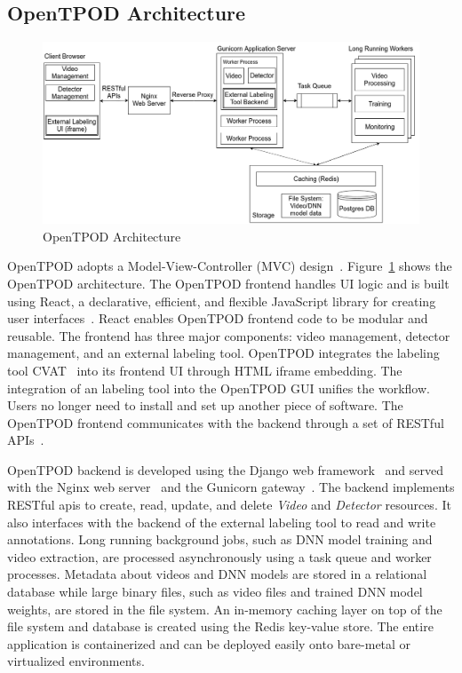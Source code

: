 \subsection{OpenTPOD Architecture}

\begin{figure}[]
  \hspace{-.1in}
    \includegraphics[width=1.1\textwidth]{FIGS/tpod-arch}
    \caption{OpenTPOD Architecture}
  \label{figs:tpod-arch}
\end{figure}

OpenTPOD adopts a Model-View-Controller (MVC) design~\cite{krasner1988description}.
Figure~\ref{figs:tpod-arch} shows the OpenTPOD architecture. The OpenTPOD frontend
handles UI logic and is built using React, a declarative, efficient, and
flexible JavaScript library for creating user interfaces~\cite{staff2016react}.
React enables OpenTPOD frontend code to be modular and reusable. The frontend has
three major components: video management, detector management, and an external
labeling tool. OpenTPOD integrates the labeling tool CVAT~\cite{cvat2019} into its
frontend UI through HTML iframe embedding. The integration of an labeling tool
into the OpenTPOD GUI unifies the workflow. Users no longer need to install and set
up another piece of software. The OpenTPOD frontend communicates with the backend
through a set of RESTful APIs~\cite{richardson2008restful}. 

OpenTPOD backend is developed using the Django web
framework~\cite{holovaty2009definitive} and served with the Nginx web
server~\cite{nedelcu2010nginx} and the Gunicorn gateway~\cite{gunicorn2017http}.
The backend implements RESTful apis to create, read, update, and delete
\textit{Video} and \textit{Detector} resources. It also interfaces with the
backend of the external labeling tool to read and write annotations. Long
running background jobs, such as DNN model training and video extraction, are
processed asynchronously using a task queue and worker processes. Metadata about
videos and DNN models are stored in a relational database while large binary
files, such as video files and trained DNN model weights, are stored in the file
system. An in-memory caching layer on top of the file system and database is
created using the Redis key-value store. The entire application is containerized and
can be deployed easily onto bare-metal or virtualized environments.

